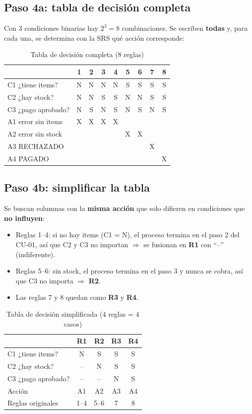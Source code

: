 \documentclass[11pt,a4paper,oneside]{report}
\begin{document}
\subsection{Paso 4a: tabla de decisión completa}
Con 3 condiciones binarias hay $2^3 = 8$ combinaciones. Se escriben \textbf{todas} y, para cada una, se determina con la SRS qué acción corresponde:
\begin{table}[H]
\centering
\caption{Tabla de decisión completa (8 reglas)}
\small
\begin{tabular}{lcccccccc}
\toprule
& 1 & 2 & 3 & 4 & 5 & 6 & 7 & 8\\
\midrule
C1 ¿tiene items? & N & N & N & N & S & S & S & S\\
C2 ¿hay stock? & N & N & S & S & N & N & S & S\\
C3 ¿pago aprobado? & N & S & N & S & N & S & N & S\\
\midrule
A1 error sin items & X & X & X & X & & & & \\
A2 error sin stock & & & & & X & X & & \\
A3 RECHAZADO & & & & & & & X & \\
A4 PAGADO & & & & & & & & X\\
\bottomrule
\end{tabular}
\end{table}

\subsection{Paso 4b: simplificar la tabla}
Se buscan columnas con la \textbf{misma acción} que solo difieren en condiciones que \textbf{no influyen}:
\begin{itemize}
  \item Reglas 1--4: si no hay items (C1 = N), el proceso termina en el paso 2 del CU-01, así que C2 y C3 no importan $\Rightarrow$ se fusionan en \textbf{R1} con ``--'' (indiferente).
  \item Reglas 5--6: sin stock, el proceso termina en el paso 3 y nunca se cobra, así que C3 no importa $\Rightarrow$ \textbf{R2}.
  \item Las reglas 7 y 8 quedan como \textbf{R3} y \textbf{R4}.
\end{itemize}
\begin{table}[H]
\centering
\caption{Tabla de decisión simplificada (4 reglas = 4 casos)}
\small
\begin{tabular}{lcccc}
\toprule
& \textbf{R1} & \textbf{R2} & \textbf{R3} & \textbf{R4}\\
\midrule
C1 ¿tiene items? & N & S & S & S\\
C2 ¿hay stock? & -- & N & S & S\\
C3 ¿pago aprobado? & -- & -- & N & S\\
\midrule
Acción & A1 & A2 & A3 & A4\\
Reglas originales & 1--4 & 5--6 & 7 & 8\\
\bottomrule
\end{tabular}
\end{table}
\end{document}
